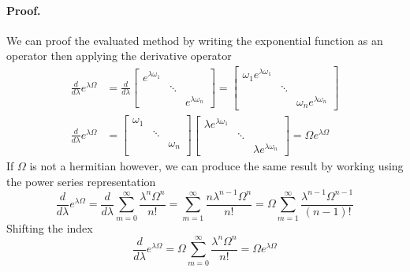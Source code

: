 \documentclass[../main.tex]{subfiles}
\begin{document}
\paragraph*{Proof.} We can proof the evaluated method by writing the exponential function as an operator then applying the derivative operator
\begin{align*}
	\frac{d }{d\lambda}e^{\lambda\Omega}  & =\frac{d }{d\lambda}
	\begin{bmatrix}
		e^{\lambda\omega_1} &        &                     \\
		                    & \ddots &                     \\
		                    &        & e^{\lambda\omega_n}
	\end{bmatrix}
	=
	\begin{bmatrix}
		\omega_1 e^{\lambda\omega_1} &        &                              \\
		                             & \ddots &                              \\
		                             &        & \omega_n e^{\lambda\omega_n}
	\end{bmatrix} \\
	\frac{d }{d\lambda }e^{\lambda\Omega} & =
	\begin{bmatrix}
		\omega_1 &        &          \\
		         & \ddots &          \\
		         &        & \omega_n \\
	\end{bmatrix}
	\begin{bmatrix}
		\lambda e^{\lambda\omega_1} &        &                             \\
		                            & \ddots &                             \\
		                            &        & \lambda e^{\lambda\omega_n}
	\end{bmatrix}
	=\Omega e^{\lambda \Omega}
\end{align*}
If $\Omega$ is not a hermitian however, we can produce the same result by working using the power series representation
\begin{equation*}
	\frac{d }{d\lambda }e^{\lambda\Omega}=\frac{d }{d\lambda} \sum_{m=0 }^{\infty }\frac{\lambda^n\Omega^n }{n! }= \sum_{m=1 }^{\infty }\frac{n\lambda^{n-1 }\Omega^{n}}{n!}=\Omega\sum_{m=1 }^{\infty}\frac{\lambda^{n-1} \Omega^{n-1}}{(n-1)!}
\end{equation*}
Shifting the index
\begin{equation*}
	\frac{d }{d\lambda }e^{\lambda \Omega}=\Omega\sum_{m=0 }^{\infty}\frac{\lambda^n \Omega^n }{n!}=\Omega e^{\lambda\Omega}
\end{equation*}
\end{document}
